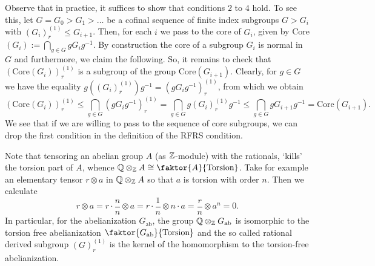 Observe that in practice, it suffices to show that conditions \(2\) to \(4\) hold. %
To see this, let \(G = G_0 > G_1 > \ldots\) be a cofinal sequence of finite index subgroups \(G > G_i\) with \((G_i)_r^{(1)} \leq G_{i+1}\).
Then, for each \(i\) we pass to the core of \(G_i\), given by Core\((G_i) := \bigcap_{g \in G} g G_i g^{-1}\).
By construction the core of a subgroup \(G_i\) is normal in \(G\) and furthermore, we claim the following.
So, it remains to check that \((\text{Core}(G_i))_r^{(1)}\) is a subgroup of the group Core\((G_{i+1})\).
Clearly,  for \(g \in G\) we have the equality \(g((G_i)_r^{(1)})g^{-1} = (gG_ig^{-1})_r^{(1)}\), from which we obtain
\[(\text{Core}(G_i))_r^{(1)} \leq \bigcap_{g \in G} (gG_ig^{-1})_r^{(1)} = \bigcap_{g \in G} g(G_i)_r^{(1)}g^{-1} \leq \bigcap_{g \in G} gG_{i+1}g^{-1} = \text{Core}(G_{i+1}).\]
We see that if we are willing to pass to the sequence of core subgroups, we can drop the first condition in the definition of the RFRS condition.

\begin{remark}\label{rmk:tensoring}
    Note that tensoring an abelian group \(A\) (as \(\mathbb{Z}\)-module) with the rationals, `kills' the torsion part of \(A\), whence \(\Q \otimes_\Z A \cong \faktor{A}{\text{Torsion}}\).
    Take for example an elementary tensor \(r \otimes a\) in \(\mathbb{Q} \otimes_{\mathbb{Z}} A\) so that \(a\) is torsion with order \(n\).
    Then we calculate
    \[r \otimes a  = r \cdot \frac{n}{n} \otimes a = r \cdot \frac{1}{n} \otimes n\cdot a = \frac{r}{n} \otimes a^n = 0.\]
    In particular, for the abelianization \(G_{\text{ab}}\), the group \(\mathbb{Q} \otimes_{\mathbb{Z}} G_{\text{ab}}\) is isomorphic to the torsion free abelianization \(\faktor{G_{\text{ab}}}{\text{Torsion}}\) and the so called rational derived subgroup \((G)_r^{(1)}\) is the kernel of the homomorphism to the torsion-free abelianization.
\end{remark}


